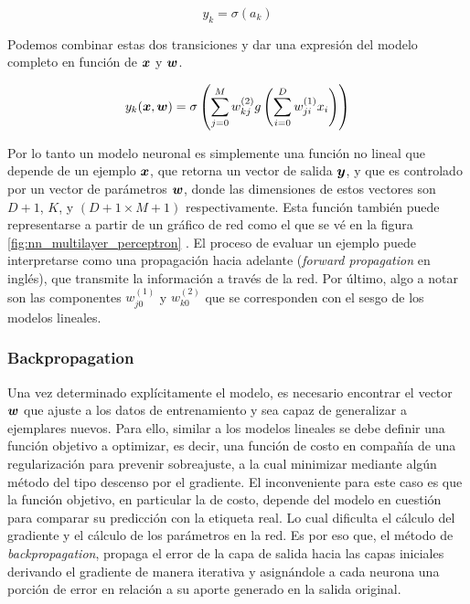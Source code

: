 \begin{equation}
    y_{k} = \sigma\left( a_k \right)
\end{equation}

Podemos combinar estas dos transiciones y dar una expresión del modelo completo
en función de $\boldsymbol{x}$ y $\boldsymbol{w}$.

\begin{equation}
    y_k(\boldsymbol{x}, \boldsymbol{w}) = \sigma\left(
                \sum_{j=0}^{M} w_{kj}^{(2)}
                    g\left( \sum_{i = 0}^{D} w_{ji}^{(1)} x_{i}
                \right)
            \right)
\end{equation}

Por lo tanto un modelo neuronal es simplemente una función no lineal que depende
de un ejemplo $\boldsymbol{x}$, que retorna un vector de salida $\boldsymbol{y}$, y que es
controlado por un vector de parámetros $\boldsymbol{w}$, donde las dimensiones de
estos vectores son $D + 1$, $K$, y $(D + 1 \times M + 1)$ respectivamente. Esta
función también puede representarse a partir de un gráfico de red como el que se
vé en la figura \ref{fig:nn_multilayer_perceptron} . El proceso de evaluar un
ejemplo puede interpretarse como una propagación hacia adelante (\emph{forward
propagation} en inglés), que transmite la información a través de la red. Por
último, algo a notar son las componentes $w_{j0}^{(1)}$ y $w_{k0}^{(2)}$ que se
corresponden con el sesgo de los modelos lineales.

\subsubsection{Backpropagation}
\label{subch:backpropagation}

Una vez determinado explícitamente el modelo, es necesario encontrar el vector
$\boldsymbol{w}$ que ajuste a los datos de entrenamiento y sea capaz de generalizar a
ejemplares nuevos. Para ello, similar a los modelos lineales se debe definir una
función objetivo a optimizar, es decir, una función de costo en compañía de una
regularización para prevenir sobreajuste, a la cual minimizar mediante algún
método del tipo descenso por el gradiente. El inconveniente para este caso es
que la función objetivo, en particular la de costo, depende del modelo en
cuestión para comparar su predicción con la etiqueta real. Lo cual dificulta el
cálculo del gradiente y el cálculo de los parámetros en la red. Es por eso que,
el método de \emph{backpropagation}, propaga el error de la capa de salida hacia
las capas iniciales derivando el gradiente de manera iterativa y asignándole a
cada neurona una porción de error en relación a su aporte generado en la salida
original.


